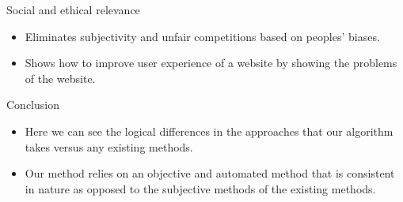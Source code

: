 \documentclass[11pt]{beamer}
\begin{document}
	\begin{frame}{Social and ethical relevance}
		\begin{itemize}
			\item Eliminates subjectivity and unfair competitions based on peoples' biases.
			\item Shows how to improve user experience of a website by showing the problems of the website.
		\end{itemize}
	\end{frame}

	\begin{frame}{Conclusion}
		\begin{itemize}
			\item Here we can see the logical differences in the approaches that our algorithm takes versus any existing methods.
			\item Our method relies on an objective and automated method that is consistent in nature as opposed to the subjective methods of the existing methods.
		\end{itemize}
	\end{frame}
\end{document}
